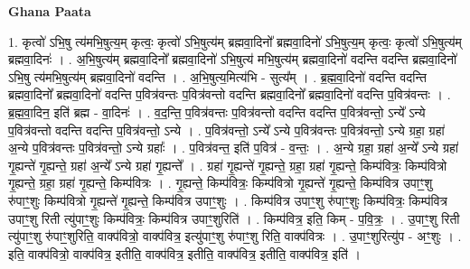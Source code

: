 \documentclass[17pt]{extarticle}
\begin{document}
\textbf{Ghana Paata } \newline

1. कृत्वो॑ ऽभि॒षु त्य॑मभि॒षुत्य॒म् कृत्वः॒ कृत्वो॑ ऽभि॒षुत्य॑म् ब्रह्मवा॒दिनो᳚ ब्रह्मवा॒दिनो॑ ऽभि॒षुत्य॒म् कृत्वः॒ कृत्वो॑ ऽभि॒षुत्य॑म् ब्रह्मवा॒दिनः॑ । . अ॒भि॒षुत्य॑म् ब्रह्मवा॒दिनो᳚ ब्रह्मवा॒दिनो॑ ऽभि॒षुत्य॑ मभि॒षुत्य॑म् ब्रह्मवा॒दिनो॑ वदन्ति वदन्ति ब्रह्मवा॒दिनो॑ ऽभि॒षु त्य॑मभि॒षुत्य॑म् ब्रह्मवा॒दिनो॑ वदन्ति । . अ॒भि॒षुत्य॒मित्य॑भि - सुत्य᳚म् । . ब्र॒ह्म॒वा॒दिनो॑ वदन्ति वदन्ति ब्रह्मवा॒दिनो᳚ ब्रह्मवा॒दिनो॑ वदन्ति प॒वित्र॑वन्तः प॒वित्र॑वन्तो वदन्ति ब्रह्मवा॒दिनो᳚ ब्रह्मवा॒दिनो॑ वदन्ति प॒वित्र॑वन्तः । . ब्र॒ह्म॒वा॒दिन॒ इति॑ ब्रह्म - वा॒दिनः॑ । . व॒द॒न्ति॒ प॒वित्र॑वन्तः प॒वित्र॑वन्तो वदन्ति वदन्ति प॒वित्र॑वन्तो॒ ऽन्ये᳚ ऽन्ये प॒वित्र॑वन्तो वदन्ति वदन्ति प॒वित्र॑वन्तो॒ ऽन्ये । . प॒वित्र॑वन्तो॒ ऽन्ये᳚ ऽन्ये प॒वित्र॑वन्तः प॒वित्र॑वन्तो॒ ऽन्ये ग्रहा॒ ग्रहा॑ अ॒न्ये प॒वित्र॑वन्तः प॒वित्र॑वन्तो॒ ऽन्ये ग्रहाः᳚ । . प॒वित्र॑वन्त॒ इति॑ प॒वित्र॑ - व॒न्तः॒ । . अ॒न्ये ग्रहा॒ ग्रहा॑ अ॒न्ये᳚ ऽन्ये ग्रहा॑ गृ॒ह्यन्ते॑ गृ॒ह्यन्ते॒ ग्रहा॑ अ॒न्ये᳚ ऽन्ये ग्रहा॑ गृ॒ह्यन्ते᳚ । . ग्रहा॑ गृ॒ह्यन्ते॑ गृ॒ह्यन्ते॒ ग्रहा॒ ग्रहा॑ गृ॒ह्यन्ते॒ किम्प॑वित्रः॒ किम्प॑वित्रो गृ॒ह्यन्ते॒ ग्रहा॒ ग्रहा॑ गृ॒ह्यन्ते॒ किम्प॑वित्रः । . गृ॒ह्यन्ते॒ किम्प॑वित्रः॒ किम्प॑वित्रो गृ॒ह्यन्ते॑ गृ॒ह्यन्ते॒ किम्प॑वित्र उपाꣳ॒॒शु रु॑पाꣳ॒॒शुः किम्प॑वित्रो गृ॒ह्यन्ते॑ गृ॒ह्यन्ते॒ किम्प॑वित्र उपाꣳ॒॒शुः । . किम्प॑वित्र उपाꣳ॒॒शु रु॑पाꣳ॒॒शुः किम्प॑वित्रः॒ किम्प॑वित्र उपाꣳ॒॒शु रिती त्यु॑पाꣳ॒॒शुः किम्प॑वित्रः॒ किम्प॑वित्र उपाꣳ॒॒शुरिति॑ । . किम्प॑वित्र॒ इति॒ किम् - प॒वि॒त्रः॒ । . उ॒पाꣳ॒॒शु रिती त्यु॑पाꣳ॒॒शु रु॑पाꣳ॒॒शुरिति॒ वाक्प॑वित्रो॒ वाक्प॑वित्र॒ इत्यु॑पाꣳ॒॒शु रु॑पाꣳ॒॒शु रिति॒ वाक्प॑वित्रः । . उ॒पाꣳ॒॒शुरित्यु॑प - अꣳ॒॒शुः । . इति॒ वाक्प॑वित्रो॒ वाक्प॑वित्र॒ इतीति॒ वाक्प॑वित्र॒ इतीति॒ वाक्प॑वित्र॒ इतीति॒ वाक्प॑वित्र॒ इति॑ । \newline
\end{document}
